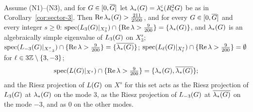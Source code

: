 \begin{proposition}
\label{prop:SU}
Assume \textup{(N1)}--\textup{(N3)}, and for $G\in[0,\overline{G}]$ let
$\lambda_*(G)=\lambda_*^{\mathrm c}(R_{\mathrm{c}}^2G)$ be as in Corollary~\ref{cor:sector-3}. Then
$\Re\lambda_*(G)>\frac{211}{2500}$, and for every $G\in[0,\overline{G}]$ and every integer
$s\ge0$: $\operatorname{spec}(L_{3}(G)|_{X^s_3})\cap\{\Re\lambda>\frac9{200}\}=\{\lambda_*(G)\}$, and
$\lambda_*(G)$ is an algebraically simple eigenvalue of $L_{3}(G)$ on $X^s_3$;
$\operatorname{spec}(L_{-3}(G)|_{X^s_{-3}})\cap\{\Re\lambda>\frac9{200}\}=\{\overline{\lambda_*(G)}\}$;
$\operatorname{spec}(L_{\ell}(G)|_{X^s_\ell})\cap\{\Re\lambda>\frac9{200}\}=\emptyset$ for
$\ell\in3\mathbb{Z}\setminus\{3,-3\}$;
\[
\operatorname{spec}(L(G)|_{X^s})\cap\{\Re\lambda>\tfrac9{200}\}=\{\lambda_*(G),\overline{\lambda_*(G)}\};
\]
and the Riesz projection of $L(G)$ on $X^s$ for this set acts as the Riesz
projection of $L_{3}(G)$ at $\lambda_*(G)$ on the mode $3$, as the Riesz
projection of $L_{-3}(G)$ at $\overline{\lambda_*(G)}$ on the mode $-3$, and as
$0$ on the other modes.
\end{proposition}
